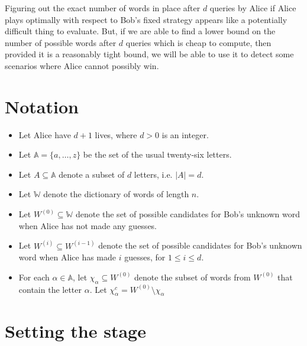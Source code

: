 \documentclass{article}
\begin{document}
{Figuring out the exact number of words in place after $d$ queries by Alice if Alice plays optimally with respect to Bob's fixed strategy appears like a potentially difficult thing to evaluate. But, if we are able to find a lower bound on the number of possible words after $d$ queries which is cheap to compute, then provided it is a reasonably tight bound, we will be able to use it to detect some scenarios where Alice cannot possibly win.

\section{Notation}

\begin{itemize}
    \item Let Alice have $d + 1$ lives, where $d > 0$ is an integer.
    \item Let $\mathbb{A} = \{a, \ldots, z\}$ be the set of the usual twenty-six letters.
    \item Let $A \subseteq \mathbb{A}$ denote a subset of $d$ letters, i.e. $|A| = d$.
    \item Let $\mathbb{W}$ denote the dictionary of words of length $n$.
    \item Let $W^{(0)} \subseteq \mathbb{W}$ denote the set of possible candidates for
        Bob's unknown word when Alice has not made any guesses.
    \item Let $W^{(i)} \subseteq W^{(i-1)}$ denote the set of possible candidates for
        Bob's unknown word when Alice has made $i$ guesses, for $1 \leq i \leq d$.
    \item For each $\alpha \in \mathbb{A}$, let $\chi_{\alpha} \subseteq W^{(0)}$ denote
        the subset of words from $W^{(0)}$ that contain the letter $\alpha$. Let
        $\chi_{\alpha}^c = W^{(0)} \setminus \chi_{\alpha}$
\end{itemize}

\section{Setting the stage}

}
\end{document}
